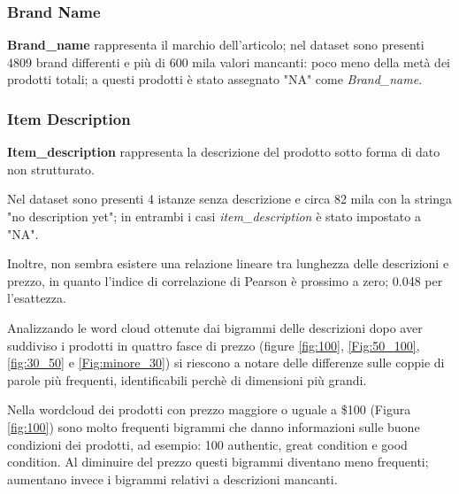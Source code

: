 \subsubsection{Brand Name}
\textbf{Brand\_name} rappresenta il marchio dell'articolo; nel dataset sono
presenti 4809 brand differenti e più di 600 mila valori mancanti: poco meno
della metà dei prodotti totali; a questi prodotti è stato assegnato "NA" come \textit{Brand\_name}.
\subsubsection{Item Description}
\textbf{Item\_description} rappresenta la descrizione del prodotto sotto forma
di dato non strutturato.

Nel dataset sono presenti 4 istanze senza descrizione e
circa 82 mila con la stringa "no description yet"; in entrambi i casi
\textit{item\_description} è stato impostato a "NA".

Inoltre, non sembra esistere una relazione lineare tra lunghezza delle
descrizioni e prezzo, in quanto l'indice di correlazione di Pearson è prossimo a
zero; 0.048 per l'esattezza.

Analizzando le word cloud ottenute dai bigrammi delle descrizioni dopo aver
suddiviso i prodotti in quattro fasce di prezzo (figure \ref{fig:100},
\ref{Fig:50_100}, \ref{fig:30_50} e \ref{Fig:minore_30}) si riescono a notare
delle differenze sulle coppie di parole più frequenti, identificabili perchè di
dimensioni più grandi.

Nella wordcloud dei prodotti con prezzo maggiore o uguale a \$100 (Figura
\ref{fig:100}) sono molto frequenti bigrammi che danno informazioni sulle buone
condizioni dei prodotti, ad esempio: 100 authentic, great condition e good
condition. Al diminuire del prezzo questi bigrammi diventano meno frequenti;
aumentano invece i bigrammi relativi a descrizioni mancanti.

